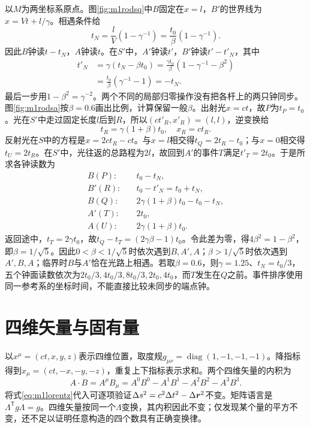 \begin{solution}
以$M$为两坐标系原点。图\ref{fig:m1rodsq}中$B$固定在$x=l$，$B'$的世界线为$x=Vt+l/\gamma$。相遇条件给
\[
 t_N=\frac{l}{V}(1-\gamma^{-1})=\frac{t_0}{\beta}(1-\gamma^{-1}).
\]
因此$B$钟读$t-t_N$，$A$钟读$t$。在$S'$中，$A'$钟读$t'$，$B'$钟读$t'-t'_N$，其中
\begin{align*}
 t'_N&=\gamma(t_N-\beta t_0)
 =\frac{\gamma t_0}{\beta}(1-\gamma^{-1}-\beta^2)\\
 &=\frac{t_0}{\beta}(\gamma^{-1}-1)=-t_N.
\end{align*}
最后一步用$1-\beta^2=\gamma^{-2}$。两个不同的局部归零操作没有把各杆上的两只钟同步。
图\ref{fig:m1rodsa}按$\beta=0.6$画出比例，计算保留一般$\beta$。出射光$x=ct$，故$P$为$t_P=t_0$。光在$S'$中走过固定长度$l$后到$R$，所以$(ct'_R,x'_R)=(l,l)$，逆变换给
\[
 t_R=\gamma(1+\beta)t_0,\quad x_R=ct_R.
\]
反射光在$S$中的方程是$x=2ct_R-ct$。与$x=l$相交得$t_Q=2t_R-t_0$；与$x=0$相交得$t_U=2t_R$。在$S'$中，光往返的总路程为$2l$，故回到$A'$的事件$T$满足$t'_T=2t_0$。于是所求各钟读数为
\begin{align*}
 B(P):&\quad t_0-t_N,\\
 B'(R):&\quad t_0-t'_N=t_0+t_N,\\
 B(Q):&\quad 2\gamma(1+\beta)t_0-t_0-t_N,\\
 A'(T):&\quad 2t_0,\\
 A(U):&\quad 2\gamma(1+\beta)t_0.
\end{align*}
返回途中，$t_T=2\gamma t_0$，故$t_Q-t_T=(2\gamma\beta-1)t_0$。令此差为零，得$4\beta^2=1-\beta^2$，即$\beta=1/\sqrt5$。因此$0<\beta<1/\sqrt5$时依次遇到$B,A',A$；$\beta>1/\sqrt5$时依次遇到$A',B,A$；临界时$B$与$A'$恰在光路上相遇。若取$\beta=0.6$，则$\gamma=1.25$、$t_N=t_0/3$，五个钟面读数依次为$2t_0/3,4t_0/3,8t_0/3,2t_0,4t_0$，而$T$发生在$Q$之前。事件排序使用同一参考系的坐标时间，不能直接比较未同步的端点钟。
\end{solution}

\section{四维矢量与固有量}\label{th:m1four}
以$x^\mu=(ct,x,y,z)$表示四维位置，取度规$g_{\mu\nu}=\operatorname{diag}(1,-1,-1,-1)$。降指标得到$x_\mu=(ct,-x,-y,-z)$，重复上下指标表示求和。两个四维矢量的内积为
\[
 A\cdot B=A^\mu B_\mu=A^0B^0-A^1B^1-A^2B^2-A^3B^3.
\]
将式\eqref{eq:m1lorentz}代入可逐项验证$\Delta s^2=c^2\Delta t^2-\Delta\bm{r}^2$不变。矩阵语言是$\Lambda^{\mathsf T}g\Lambda=g$。四维矢量按同一个$\Lambda$变换，其内积因此不变；仅发现某个量的平方不变，还不足以证明任意构造的四个数具有正确变换律。

